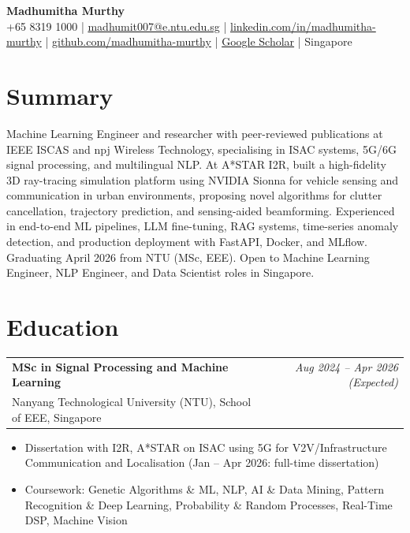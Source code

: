 \documentclass[10pt, a4paper]{article}
\makeatletter
\newcommand{\eduentry}[3]{%
    \noindent
    \begin{tabularx}{\textwidth}{@{}X r@{}}
        \textbf{#1} & \textit{#3} \\
        #2 &
    \end{tabularx}%
    \vspace{1pt}%
}
\newcommand{\entryspace}{\vspace{6pt}}
\newcommand{\sectionspace}{\vspace{2pt}}
\makeatother
\begin{document}
\pagestyle{empty}

\begin{center}
    {\LARGE\bfseries\color{headingblue} Madhumitha Murthy}\\[4pt]
    {\small
        +65 8319 1000 \quad|\quad
        \href{mailto:madhumit007@e.ntu.edu.sg}{madhumit007@e.ntu.edu.sg} \quad|\quad
        \href{https://linkedin.com/in/madhumitha-murthy-4801b7223}{linkedin.com/in/madhumitha-murthy} \quad|\quad
        \href{https://github.com/madhumitha-murthy}{github.com/madhumitha-murthy} \quad|\quad
        \href{https://scholar.google.com/citations?user=4jVqyt0AAAAJ}{Google Scholar} \quad|\quad
        Singapore
    }
\end{center}

\vspace{4pt}

\section{Summary}
\sectionspace

Machine Learning Engineer and researcher with peer-reviewed publications at IEEE ISCAS and npj Wireless Technology, specialising in ISAC systems, 5G/6G signal processing, and multilingual NLP. At A*STAR I2R, built a high-fidelity 3D ray-tracing simulation platform using NVIDIA Sionna for vehicle sensing and communication in urban environments, proposing novel algorithms for clutter cancellation, trajectory prediction, and sensing-aided beamforming. Experienced in end-to-end ML pipelines, LLM fine-tuning, RAG systems, time-series anomaly detection, and production deployment with FastAPI, Docker, and MLflow. Graduating April 2026 from NTU (MSc, EEE). Open to Machine Learning Engineer, NLP Engineer, and Data Scientist roles in Singapore.

\entryspace

\section{Education}
\sectionspace

\eduentry{MSc in Signal Processing and Machine Learning}{Nanyang Technological University (NTU), School of EEE, Singapore}{Aug 2024 -- Apr 2026 (Expected)}
\begin{itemize}
    \item Dissertation with I2R, A*STAR on ISAC using 5G for V2V/Infrastructure Communication and Localisation (Jan -- Apr 2026: full-time dissertation)
    \item Coursework: Genetic Algorithms \& ML, NLP, AI \& Data Mining, Pattern Recognition \& Deep Learning, Probability \& Random Processes, Real-Time DSP, Machine Vision
\end{itemize}
\end{document}

